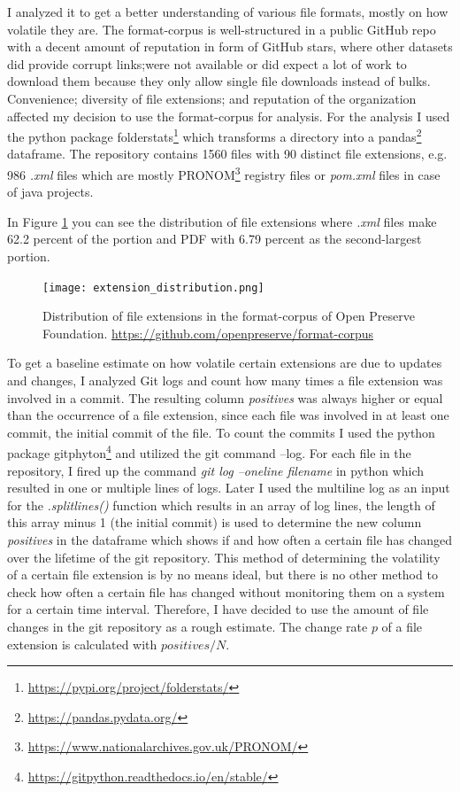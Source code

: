 \documentclass[final]{vutinfth}
\begin{document}
I analyzed it to get a better understanding of various file formats, mostly on how volatile they are. The format-corpus is well-structured in a public GitHub repo with a decent amount of reputation in form of GitHub stars, where other datasets did provide corrupt links;were not available or did expect a lot of work to download them because they only allow single file downloads instead of bulks. Convenience; diversity of file extensions; and reputation of the organization affected my decision to use the format-corpus for analysis.
For the analysis I used the python package folderstats\footnote{\url{https://pypi.org/project/folderstats/}} which transforms a directory into a pandas\footnote{\url{https://pandas.pydata.org/}} dataframe. The repository contains 1560 files with 90 distinct file extensions, e.g. 986 \textit{.xml} files which are mostly PRONOM\footnote{\url{https://www.nationalarchives.gov.uk/PRONOM/}} registry files or \textit{pom.xml} files in case of java projects. 

In Figure \ref{fig:extension_distribution} you can see the distribution of file extensions where \textit{.xml} files make 62.2 percent of the portion and PDF with 6.79 percent as the second-largest portion.
\begin{figure}[t]
    \centering
    \texttt{[image: extension\_distribution.png]}
    \caption{Distribution of file extensions in the format-corpus of Open Preserve Foundation. \url{https://github.com/openpreserve/format-corpus}}
    \label{fig:extension_distribution}
\end{figure}
To get a baseline estimate on how volatile certain extensions are due to updates and changes, I analyzed Git logs and count how many times a file extension was involved in a commit. The resulting column \textit{positives} was always higher or equal than the occurrence of a file extension, since each file was involved in at least one commit, the initial commit of the file. To count the commits I used the python package gitphyton\footnote{\url{https://gitpython.readthedocs.io/en/stable/}} and utilized the git command --log. For each file in the repository, I fired up the command \textit{git log --oneline filename} in python which resulted in one or multiple lines of logs. Later I used the multiline log as an input for the \textit{.splitlines()} function which results in an array of log lines, the length of this array minus 1 (the initial commit) is used to determine the new column \textit{positives} in the dataframe which shows if and how often a certain file has changed over the lifetime of the git repository. 
This method of determining the volatility of a certain file extension is by no means ideal, but there is no other method to check how often a certain file has changed without monitoring them on a system for a certain time interval. Therefore, I have decided to use the amount of file changes in the git repository as a rough estimate.
The change rate $p$ of a file extension is calculated with $positives/N$.
\end{document}

